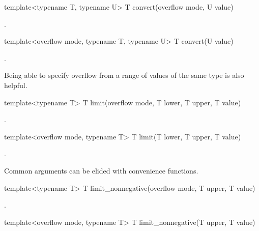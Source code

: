 \begin{itemdecl}
template<typename T, typename U> T convert(overflow mode, U value)		
\end{itemdecl}

\begin{itemdescr}
\returns {}.	
\end{itemdescr}

\begin{itemdecl}
template<overflow mode, typename T, typename U> T convert(U value)		
\end{itemdecl}

\begin{itemdescr}
\returns {}.	
\end{itemdescr}

Being able to specify overflow from a range of values of the same type is also helpful.

\begin{itemdecl}
template<typename T> T limit(overflow mode, T lower, T upper, T value)		
\end{itemdecl}

\begin{itemdescr}
\returns {}.	
\end{itemdescr}

\begin{itemdecl}
template<overflow mode, typename T> T limit(T lower, T upper, T value)		
\end{itemdecl}

\begin{itemdescr}
\returns {}.	
\end{itemdescr}

Common arguments can be elided with convenience functions.

\begin{itemdecl}
template<typename T> T limit_nonnegative(overflow mode, T upper, T value)		
\end{itemdecl}

\begin{itemdescr}
\returns {}.	
\end{itemdescr}

\begin{itemdecl}
template<overflow mode, typename T> T limit_nonnegative(T upper, T value)		
\end{itemdecl}

